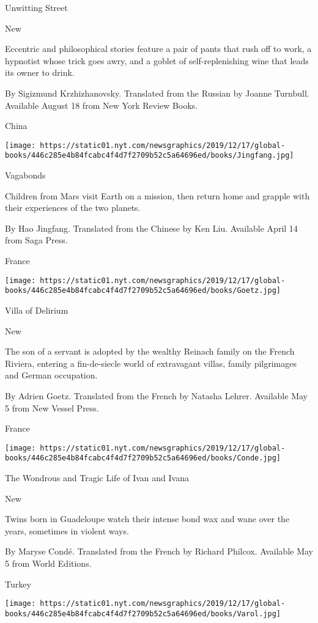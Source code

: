 Unwitting Street

New

Eccentric and philosophical stories feature a pair of pants that rush
off to work, a hypnotist whose trick goes awry, and a goblet of
self-replenishing wine that leads its owner to drink.

 By Sigizmund Krzhizhanovsky. Translated from the Russian by Joanne
Turnbull. Available August 18 from New York Review Books.

China

\texttt{[image: https://static01.nyt.com/newsgraphics/2019/12/17/global-books/446c285e4b84fcabc4f4d7f2709b52c5a64696ed/books/Jingfang.jpg]}

Vagabonds

Children from Mars visit Earth on a mission, then return home and
grapple with their experiences of the two planets.

 By Hao Jingfang. Translated from the Chinese by Ken Liu. Available
April 14 from Saga Press.

France

\texttt{[image: https://static01.nyt.com/newsgraphics/2019/12/17/global-books/446c285e4b84fcabc4f4d7f2709b52c5a64696ed/books/Goetz.jpg]}

Villa of Delirium

New

The son of a servant is adopted by the wealthy Reinach family on the
French Riviera, entering a fin-de-siecle world of extravagant villas,
family pilgrimages and German occupation.

 By Adrien Goetz. Translated from the French by Natasha Lehrer.
Available May 5 from New Vessel Press.

France

\texttt{[image: https://static01.nyt.com/newsgraphics/2019/12/17/global-books/446c285e4b84fcabc4f4d7f2709b52c5a64696ed/books/Conde.jpg]}

The Wondrous and Tragic Life of Ivan and Ivana

New

Twins born in Guadeloupe watch their intense bond wax and wane over the
years, sometimes in violent ways.

 By Maryse Condé. Translated from the French by Richard Philcox.
Available May 5 from World Editions.

Turkey

\texttt{[image: https://static01.nyt.com/newsgraphics/2019/12/17/global-books/446c285e4b84fcabc4f4d7f2709b52c5a64696ed/books/Varol.jpg]}

